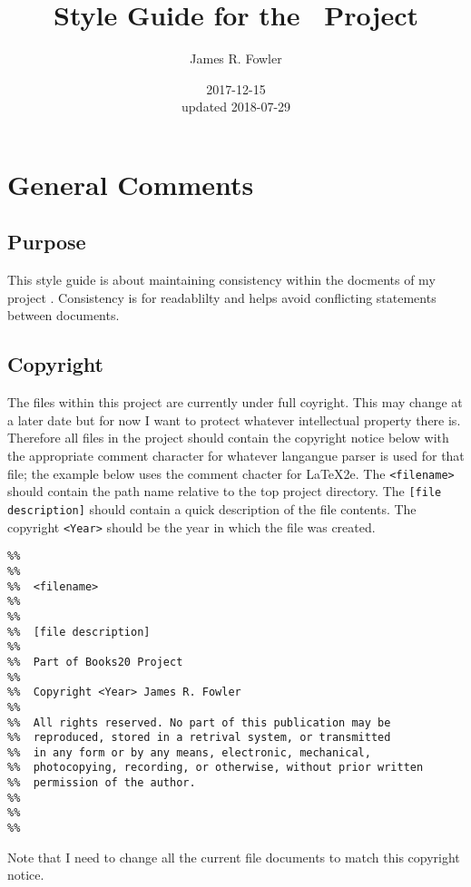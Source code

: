 \documentclass{book}
\begin{document}
\title{Style Guide for the \ProjectTitle\ Project}
\author{James R. Fowler}
\date{2017-12-15\\ updated 2018-07-29}

\maketitle

\tableofcontents

\chapter{General Comments}

\section{Purpose}
This style guide is about maintaining consistency within the docments
of my project \ProjectTitle. Consistency is for readablilty and
helps avoid conflicting statements between documents. 

\section{Copyright}

The files within this project are currently under full coyright.  This
may change at a later date but for now I want to protect whatever
intellectual property there is.  Therefore all files in the project
should contain the copyright notice below with the appropriate comment
character for whatever langangue parser is used for that file; the
example below uses the comment chacter for \LaTeX2e.  The
\texttt{<filename>} should contain the path name relative to the top
project directory. The \texttt{[file description]} should contain a
quick description of the file contents. The copyright \texttt{<Year>}
should be the year in which the file was created.

\begin{verbatim}
%%
%%
%%  <filename>
%%
%%  
%%  [file description]
%%
%%  Part of Books20 Project
%%
%%  Copyright <Year> James R. Fowler
%%
%%  All rights reserved. No part of this publication may be
%%  reproduced, stored in a retrival system, or transmitted
%%  in any form or by any means, electronic, mechanical,
%%  photocopying, recording, or otherwise, without prior written
%%  permission of the author.
%%
%%
%%
\end{verbatim}

Note that I need to change all the current file documents to match
this copyright notice.
\end{document}
